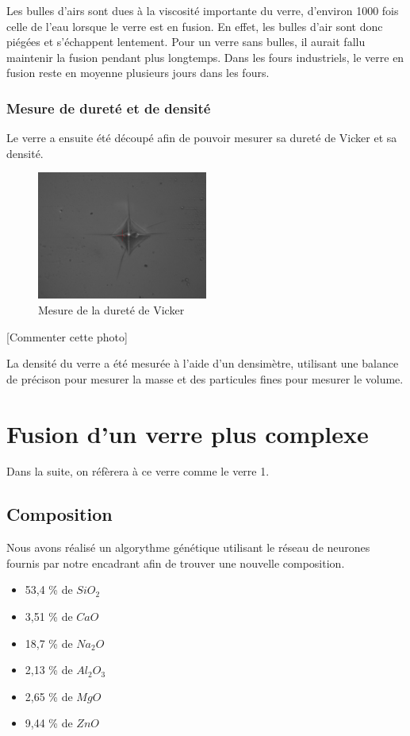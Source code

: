 \documentclass{article}
\begin{document}
Les bulles d'airs sont dues à la viscosité importante du verre, d'environ 1000 fois celle de l'eau lorsque le verre est en fusion. En effet, les bulles d'air sont donc piégées et s'échappent lentement. Pour un verre sans bulles, il aurait fallu maintenir la fusion pendant plus longtemps. Dans les fours industriels, le verre en fusion reste en moyenne plusieurs jours dans les fours.

\subsubsection{Mesure de dureté et de densité}

Le verre a ensuite été découpé afin de pouvoir mesurer sa dureté de Vicker et sa densité. 


\begin{figure}[h]
    \centering
    \includegraphics[width=0.5\textwidth]{photos/dureté.jpg}
    \caption{Mesure de la dureté de Vicker}
\end{figure}

[Commenter cette photo]


La densité du verre a été mesurée à l'aide d'un densimètre, utilisant une balance de précison pour mesurer la masse et des particules fines pour mesurer le volume. 

\section{Fusion d'un verre plus complexe}
Dans la suite, on réfèrera à ce verre comme le verre 1.

\subsection{Composition}

Nous avons réalisé un algorythme génétique utilisant le réseau de neurones fournis par notre encadrant afin de trouver une nouvelle composition. 

\begin{itemize}
    \item 53,4 \% de $SiO_2$
    \item 3,51 \% de $CaO$
    \item 18,7 \% de $Na_2O$
    \item 2,13 \% de $Al_2O_3$
    \item 2,65 \% de $MgO$
    \item 9,44 \% de $ZnO$
\end{itemize}
\end{document}

